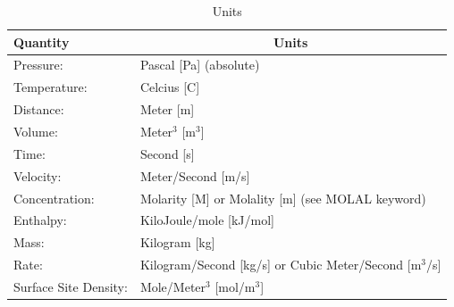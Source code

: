 \documentclass[12pt]{article}
\begin{document}
\begin{table}[h]\centering
\caption{Units}\label{tunits}

\vspace{3mm}

\begin{tabular}{ll}
\toprule[2pt]
Quantity & \multicolumn{1}{c}{Units}\\
\midrule[1pt]
Pressure: & Pascal [Pa] (absolute)\\
Temperature: & Celcius [C]\\
Distance: & Meter [m]\\
Volume: & Meter$^3$ [m$^3$]\\
Time: & Second [s]\\
Velocity: & Meter/Second [m/s]\\
Concentration: & Molarity [M] or Molality [m] (see MOLAL keyword)\\
Enthalpy: & KiloJoule/mole [kJ/mol]\\
Mass: & Kilogram [kg]\\
Rate: & Kilogram/Second [kg/s] or Cubic Meter/Second [m$^3$/s]\\
Surface Site Density: & Mole/Meter$^{3}$ [mol/m$^{3}$]\\
\bottomrule[1.5pt]
\end{tabular}
\end{table}

\end{document}
